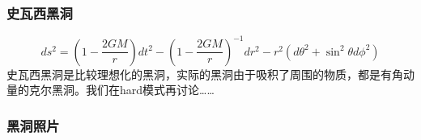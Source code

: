 \documentclass[CJK,13pt]{beamer}
\begin{document}
  \begin{frame}
    \frametitle{史瓦西黑洞}
    $$ ds^2 = \left(1-\frac{2GM}{r}\right)dt^2 - \left(1-\frac{2GM}{r}\right)^{-1} dr^2 - r^2\left(d\theta^2 + \sin^2\theta d\phi^2\right)$$
    {\scriptsize 史瓦西黑洞是比较理想化的黑洞，实际的黑洞由于吸积了周围的物质，都是有角动量的克尔黑洞。我们在hard模式再讨论……}
  \end{frame}


  \begin{frame}
    \frametitle{黑洞照片}
  \end{frame}
  
\ech
\end{document}
